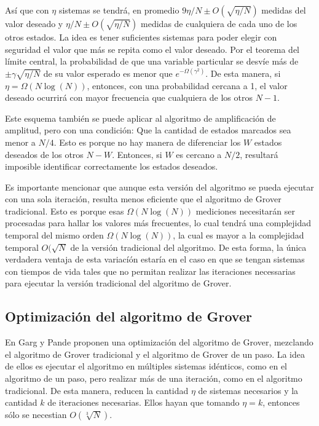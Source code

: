 Así que con $\eta$ sistemas se tendrá, en promedio $9 \eta/N \pm O(\sqrt{\eta/N})$ medidas del valor deseado y $\eta/N \pm O(\sqrt{\eta/N})$ medidas de cualquiera de cada uno de los otros estados. La idea es tener suficientes sistemas para poder elegir con seguridad el valor que más se repita como el valor deseado. Por el teorema del límite central, la probabilidad de que una variable particular se desvíe más de $\pm \gamma \sqrt{\eta/N}$ de su valor esperado es menor que $e^{- \Omega(\gamma^2)}$. De esta manera, si $\eta = \Omega(N \log(N))$, entonces, con una probabilidad cercana a 1, el valor deseado ocurrirá con mayor frecuencia que cualquiera de los otros $N-1$.

Este esquema también se puede aplicar al algoritmo de amplificación de amplitud, pero con una condición: Que la cantidad de estados marcados sea menor a $N/4$. Esto es porque no hay manera de diferenciar los $W$ estados deseados de los otros $N - W$. Entonces, si $W$ es cercano a $N/2$, resultará imposible identificar correctamente los estados deseados.

Es importante mencionar que aunque esta versión del algoritmo se pueda ejecutar con una sola iteración, resulta menos eficiente que el algoritmo de Grover tradicional. Esto es porque esas $\Omega(N \log(N))$ mediciones necesitarán ser procesadas para hallar los valores más frecuentes, lo cual tendrá una complejidad temporal del mismo orden $\Omega(N \log(N))$, la cual es mayor a la complejidad temporal $O(\sqrt{N}$ de la versión tradicional del algoritmo. De esta forma, la única verdadera ventaja de esta variacíón estaría en el caso en que se tengan sistemas con tiempos de vida tales que no permitan realizar las iteraciones necessarias para ejecutar la versión tradicional del algoritmo de Grover.

\subsection{Optimización del algoritmo de Grover}

En \cite{Garg} Garg y Pande proponen una optimización del algoritmo de Grover, mezclando el algoritmo de Grover tradicional y el algoritmo de Grover de un paso. La idea de ellos es ejecutar el algoritmo en múltiples sistemas idénticos, como en el algoritmo de un paso, pero realizar más de una iteración, como en el algoritmo tradicional. De esta manera, reducen la cantidad $\eta$ de sistemas necesarios y la cantidad $k$ de iteraciones necesarias. Ellos hayan que tomando $\eta = k$, entonces sólo se necestian $O(\sqrt[3]{N})$.


